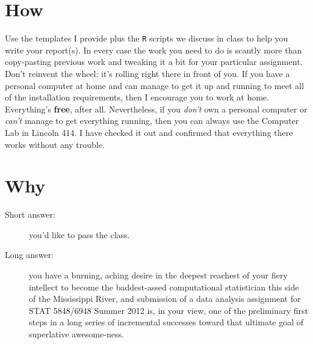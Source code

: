 \documentclass[10pt,english]{article}
\begin{document}
\section*{How}
\label{sec-5}

Use the templates I provide plus the \texttt{R} scripts we discuss in class to help you write your report(s).  In every case the work you need to do is scantly more than copy-pasting previous work and tweaking it a bit for your particular assignment.  Don't reinvent the wheel;  it's rolling right there in front of you.  If you have a personal computer at home and can manage to get it up and running to meet all of the installation requirements, then I encourage you to work at home.  Everything's \textbf{free}, after all.  Nevertheless, if you \emph{don't} own a personal computer or \emph{can't} manage to get everything running, then you can always use the Computer Lab in Lincoln 414.  I have checked it out and confirmed that everything there works without any trouble. 
\section*{Why}
\label{sec-6}

\begin{description}
\item[Short answer:] you'd like to pass the class.
\item[Long answer:] you have a burning, aching desire in the deepest reachest of your fiery intellect to become the baddest-assed computational statistician this side of the Mississippi River, and submission of a data analysis assignment for STAT 5848/6948 Summer 2012 is, in your view, one of the preliminary first steps in a long series of incremental successes toward that ultimate goal of superlative awesome-ness.
\end{description}
\end{document}
